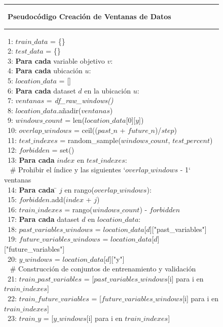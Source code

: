 \begin{figure}[H]
{\small
 \hrule \
 {\bf\small Pseudocódigo Creación de Ventanas de Datos}
 \hrule
\begin{center}
\begin{tabbing}
\ 1: $train\_data$ = \{\} \\
\ 2: $test\_data$ = \{\} \\
\ 3: {\bf Par}\={\bf a cada} variable objetivo $v$: \\
\ 4: \> {\bf Par}\={\bf a cada} ubicación $u$:  \\
\ 5: \> $location\_data$ = [] \\
\ 6: \> \> {\bf Par}\={\bf a cada} dataset $d$ en la ubicación $u$:  \\
\ 7: \> \> \> $ventanas$ =  \textit{df\_raw\_windows()} \\
\ 8: \> \> \> $location\_data$.añadir($ventanas$) \\
\ 9: \> \> $windows\_count$ = len($location\_data$[0][$y$]) \\
\ 10: \> \> $overlap\_windows$ = ceil(($past\_n$ + $future\_n$)/$step$) \\
\ 11: \> \> $test\_indexes$ = random\_sample($windows\_count$, $test\_percent$) \\
\ 12: \> \> $forbidden$ = set() \\
\ 13: \> \> {\bf Par}\={\bf a cada} $index$ en $test\_indexes$: \\
\     \> \> \>   \# Prohibir el índice y las siguientes `$overlap\_windows$ - 1` ventanas \\
\ 14: \> \> \>   {\bf Par}\={\bf a cada} \= $j$ en rango($overlap\_windows$): \\
\ 15: \> \> \> \>     $forbidden$.add($index$ + $j$) \\
\ 16: \> \> $train\_indexes$ = rango($windows\_count$) - $forbidden$ \\

\ 17: \> \> {\bf Par}\={\bf a cada} dataset $d$ en $location\_data$: \\
\ 18: \> \> \> $past\_variables\_windows$ = $location\_data$[$d$]["past\_variables"] \\
\ 19: \> \> \> $future\_variables\_windows$ = $location\_data$[$d$]["future\_variables"] \\
\ 20: \> \> \> $y\_windows$ = $location\_data$[$d$]["y"] \\
\     \> \> \> \# Construcción de conjuntos de entrenamiento y validación \\
\ 21: \> \> \> $train\_past\_variables$ = [$past\_variables\_windows$[i] para i en $train\_indexes$] \\
\ 22: \> \> \> $train\_future\_variables$ = [$future\_variables\_windows$[i] para i en $train\_indexes$] \\
\ 23: \> \> \> $train\_y$ = [$y\_windows$[i] para i en $train\_indexes$] \\


\end{tabbing}
\end{center}}
\end{figure}
